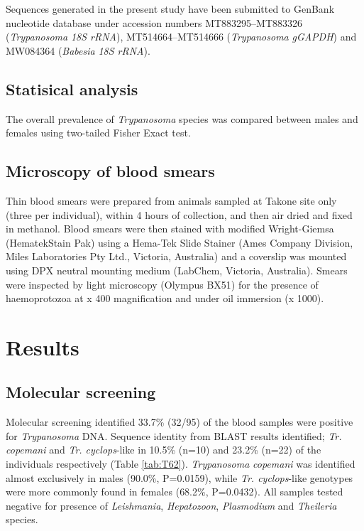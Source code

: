 \documentclass[a4paper, nobind]{templates/ociamthesis}
\begin{document}
Sequences generated in the present study have been submitted to GenBank nucleotide database under accession numbers MT883295--MT883326 (\emph{Trypanosoma} \emph{18S rRNA}), MT514664--MT514666 (\emph{Trypanosoma} \emph{gGAPDH}) and MW084364 (\emph{Babesia} \emph{18S rRNA}).

\hypertarget{statisical-analysis}{%
\subsection{Statisical analysis}\label{statisical-analysis}}

The overall prevalence of \emph{Trypanosoma} species was compared between males and females using two-tailed Fisher Exact test.

\hypertarget{microscopy-of-blood-smears}{%
\subsection{Microscopy of blood smears}\label{microscopy-of-blood-smears}}

Thin blood smears were prepared from animals sampled at Takone site only (three per individual), within 4 hours of collection, and then air dried and fixed in methanol. Blood smears were then stained with modified Wright-Giemsa (Hematek\textregistered Stain Pak) using a Hema-Tek Slide Stainer (Ames Company Division, Miles Laboratories Pty Ltd., Victoria, Australia) and a coverslip was mounted using DPX neutral mounting medium (LabChem, Victoria, Australia). Smears were inspected by light microscopy (Olympus BX51) for the presence of haemoprotozoa at x 400 magnification and under oil immersion (x 1000).

\hypertarget{results-2}{%
\section{Results}\label{results-2}}

\hypertarget{molecular-screening-1}{%
\subsection{Molecular screening}\label{molecular-screening-1}}

Molecular screening identified 33.7\% (32/95) of the blood samples were positive for \emph{Trypanosoma} DNA. Sequence identity from BLAST results identified; \emph{Tr. copemani} and \emph{Tr. cyclops}-like in 10.5\% (n=10) and 23.2\% (n=22) of the individuals respectively (Table \ref{tab:T62}). \emph{Trypanosoma} \emph{copemani} was identified almost exclusively in males (90.0\%, P=0.0159), while \emph{Tr. cyclops}-like genotypes were more commonly found in females (68.2\%, P=0.0432). All samples tested negative for presence of \emph{Leishmania}, \emph{Hepatozoon}, \emph{Plasmodium} and \emph{Theileria} species.
\end{document}
